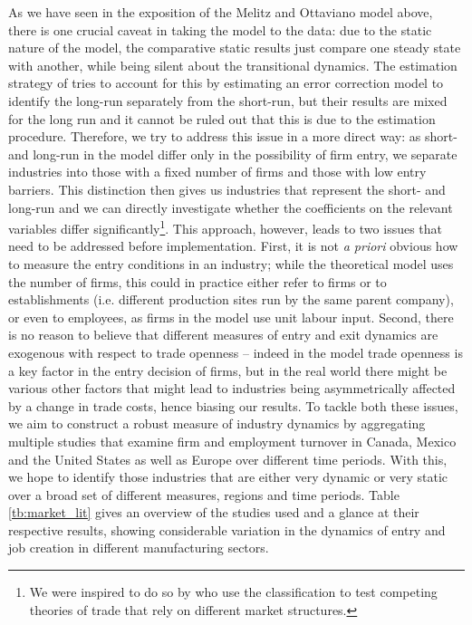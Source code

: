 As we have seen in the exposition of the Melitz and Ottaviano model above, there is one crucial caveat in taking the model to the data: due to the static nature of the model, the comparative static results just compare one steady state with another, while being silent about the transitional dynamics. The estimation strategy of \citet{Chen2009} tries to account for this by estimating an error correction model to identify the long-run separately from the short-run, but their results are mixed for the long run and it cannot be ruled out that this is due to the estimation procedure. Therefore, we try to address this issue in a more direct way: as short- and long-run in the model differ only in the possibility of firm entry, we separate industries into those with a fixed number of firms and those with low entry barriers. This distinction then gives us industries that represent the short- and long-run and we can directly investigate whether the coefficients on the relevant variables differ significantly\footnote{We were inspired to do so by \citet{Head1999} who use the classification to test competing theories of trade that rely on different market structures.}. This approach, however, leads to two issues that need to be addressed before implementation. First, it is not \textit{a priori} obvious how to measure the entry conditions in an industry; while the theoretical model uses the number of firms, this could in practice either refer to firms or to establishments (i.e. different production sites run by the same parent company), or even to employees, as firms in the model use unit labour input. Second, there is no reason to believe that different measures of entry and exit dynamics are exogenous with respect to trade openness -- indeed in the model trade openness is a key factor in the entry decision of firms, but in the real world there might be various other factors that might lead to industries being asymmetrically affected by a change in trade costs, hence biasing our results. To tackle both these issues, we aim to construct a robust measure of industry dynamics by aggregating multiple studies that examine firm and employment turnover in Canada, Mexico and the United States as well as Europe over different time periods. With this, we hope to identify those industries that are either very dynamic or very static over a broad set of different measures, regions and time periods. Table \ref{tb:market_lit} gives an overview of the studies used and a glance at their respective results, showing considerable variation in the dynamics of entry and job creation in different manufacturing sectors.
 
